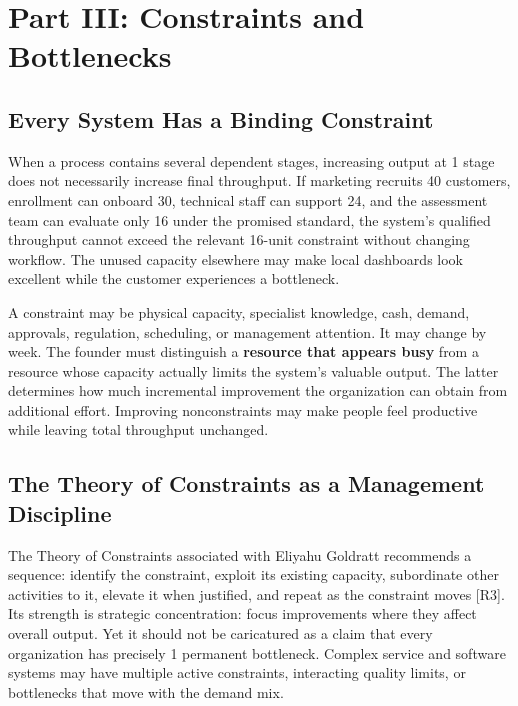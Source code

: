 \section*{Part III: Constraints and Bottlenecks}

\subsection{Every System Has a Binding Constraint}
\label{sec:system_binding_constraint}

When a process contains several dependent stages, increasing output at 1 stage does not necessarily increase final throughput. If marketing recruits 40 customers, enrollment can onboard 30, technical staff can support 24, and the assessment team can evaluate only 16 under the promised standard, the system's qualified throughput cannot exceed the relevant 16-unit constraint without changing workflow. The unused capacity elsewhere may make local dashboards look excellent while the customer experiences a bottleneck.

A constraint may be physical capacity, specialist knowledge, cash, demand, approvals, regulation, scheduling, or management attention. It may change by week. The founder must distinguish a \textbf{resource that appears busy} from a resource whose capacity actually limits the system's valuable output. The latter determines how much incremental improvement the organization can obtain from additional effort. Improving nonconstraints may make people feel productive while leaving total throughput unchanged.

\subsection{The Theory of Constraints as a Management Discipline}
\label{sec:theory_of_constraints}

The Theory of Constraints associated with Eliyahu Goldratt recommends a sequence: identify the constraint, exploit its existing capacity, subordinate other activities to it, elevate it when justified, and repeat as the constraint moves [R3]. Its strength is strategic concentration: focus improvements where they affect overall output. Yet it should not be caricatured as a claim that every organization has precisely 1 permanent bottleneck. Complex service and software systems may have multiple active constraints, interacting quality limits, or bottlenecks that move with the demand mix.

